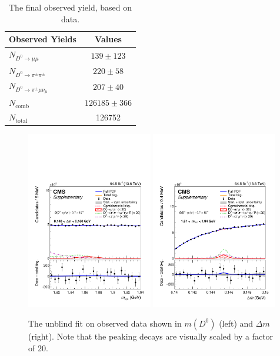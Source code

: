 \begin{table}[h!]
    \centering
    \begin{tabular}{|l|c|}
    \hline
    \textbf{Observed Yields} & \textbf{Values} \\
    \hline
    $N_{D^0 \rightarrow \mu\mu}$ & $139 \pm 123$ \\
    $N_{D^0 \rightarrow \pi^\pm\pi^\pm}$ & $220 \pm 58$ \\
    $N_{D^0 \rightarrow \pi^\pm\mu\nu_\mu}$ & $207 \pm 40$ \\
    $N_{\text{comb}}$ & $126185 \pm 366$ \\
    $N_{\text{total}}$ & 126752 \\
    \hline
\end{tabular}
\caption{The final observed yield, based on data.}
\label{tab:final_observed_yeild}
\end{table}

\begin{figure}[h!]
    \begin{center}
      \includegraphics[width=0.49\textwidth]{figures/chapter4/results/SB_plot_m_full_test.pdf}
      \includegraphics[width=0.49\textwidth]{figures/chapter4/results/SB_plot_dm_full_test.pdf}\\
    \end{center}
    \caption{
      The unblind fit on observed data shown in $m(D^0)$ (left) and $\Delta m$ (right). Note that the peaking decays are visually scaled by a factor of 20.
    }
    \label{fig:final_observed_fit}
  \end{figure}
